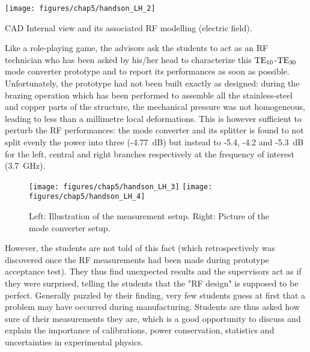 \begin{marginfigure}
	\centering
	\texttt{[image: figures/chap5/handson\_LH\_2]}
	\caption{CAD Internal view and its associated RF modelling (electric field).}
	\label{fig:handsonlh2}
\end{marginfigure}

Like a role-playing game, the advisors ask the students to act as an RF technician who has been asked by his/her head to characterize this ${\mathrm{TE}}_{10}$-${\mathrm{TE}}_{30}$ mode converter prototype and to report its performances as soon as possible. Unfortunately, the prototype had not been built exactly as designed: during the brazing operation which has been performed to assemble all the stainless-steel and copper parts of the structure, the mechanical pressure was not homogeneous, leading to less than a millimetre local deformations. This is however sufficient to perturb the RF performances: the mode converter and its splitter is found to not split evenly the power into three (-4.77~dB) but instead to -5.4, -4.2 and -5.3~dB for the left, central and right branches respectively at the frequency of interest (3.7~GHz). 

\begin{figure*}
	\centering
	\texttt{[image: figures/chap5/handson\_LH\_3]}
	\texttt{[image: figures/chap5/handson\_LH\_4]}
	\caption{Left: Illustration of the measurement setup. Right: Picture of the mode converter setup.}
	\label{fig:handsonlh3}
\end{figure*}


However, the students are not told of this fact (which retrospectively was discovered once the RF measurements had been made during prototype acceptance test). They thus find unexpected results and the supervisors act as if they were surprised, telling the students that the "RF design" is supposed to be perfect. Generally puzzled by their finding, very few students guess at first that a problem may have occurred during manufacturing. Students are thus asked how sure of their measurements they are, which is a good opportunity to discuss and explain the importance of calibrations, power conservation, statistics and uncertainties in experimental physics.

